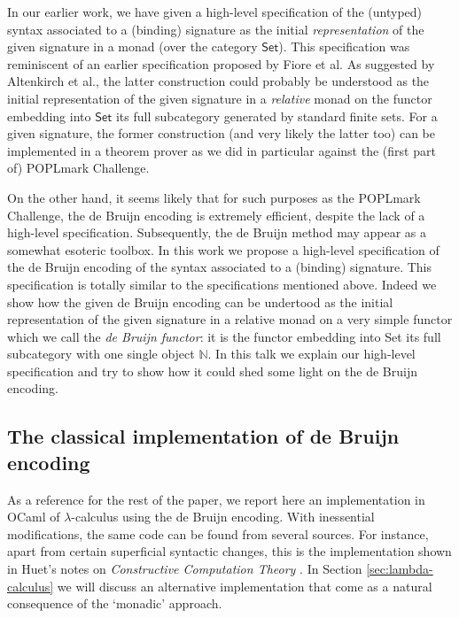 \documentclass[a4paper,twoside,12pt]{article}
\theoremstyle{definition}
\theoremstyle{remark}
\theoremstyle{example}
\newcommand{\NN}{\mathbb{N}}
\begin{document}
In our earlier work, we have given a high-level specification of the
(untyped) syntax associated to a (binding) signature as the initial
\emph{representation} of the given signature in a monad (over the
category $\mathsf{Set}$). This specification was reminiscent of an
earlier specification proposed by Fiore et al. As suggested by
Altenkirch et al., the latter construction could probably be
understood as the initial representation of the given signature in a
\emph{relative} monad on the functor embedding into $\mathsf{Set}$ its
full subcategory generated by standard finite sets. For a given
signature, the former construction (and very likely the latter too)
can be implemented in a theorem prover as we did in particular against
the (first part of) POPLmark Challenge.

On the other hand, it seems likely that for such purposes as the
POPLmark Challenge, the de Bruijn encoding is extremely efficient,
despite the lack of a high-level specification.  Subsequently, the de
Bruijn method may appear as a somewhat esoteric toolbox. In this work
we propose a high-level specification of the de Bruijn encoding of the
syntax associated to a (binding) signature. This specification is
totally similar to the specifications mentioned above. Indeed we show
how the given de Bruijn encoding can be undertood as the initial
representation of the given signature in a relative monad on a very
simple functor which we call the \emph{de Bruijn functor}: it is the
functor embedding into Set its full subcategory with one single object
$\NN$. In this talk we explain our high-level specification and try to
show how it could shed some light on the de Bruijn encoding.


\subsection{The classical implementation of de Bruijn encoding}
\label{sec:classical-de-bruijn}

As a reference for the rest of the paper, we report here an
implementation in OCaml of $\lambda$-calculus using the de Bruijn
encoding.  With inessential modifications, the same code can be found
from several sources.  For instance, apart from certain superficial
syntactic changes, this is the implementation shown in Huet's notes on
\emph{Constructive Computation Theory} \cite[Section 1.4.2,
p.~15]{Huet-1992}.  In Section \ref{sec:lambda-calculus} we will
discuss an alternative implementation that come as a natural
consequence of the `monadic' approach.
\end{document}
